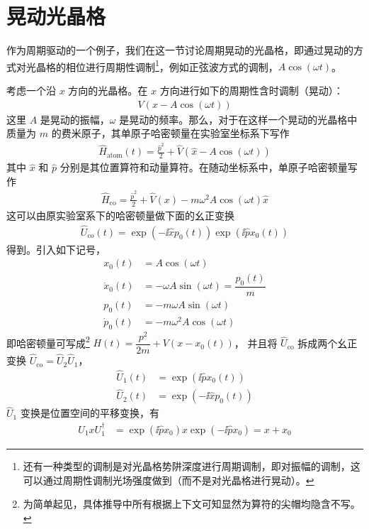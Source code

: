 \section{晃动光晶格}\label{sec:floq:sl}

作为周期驱动的一个例子，我们在这一节讨论周期晃动的光晶格，即通过晃动的方式对光晶格的相位进行周期性调制\footnote{还有一种类型的调制是对光晶格势阱深度进行周期调制，即对振幅的调制，这可以通过周期性调制光场强度做到（而不是对光晶格进行晃动）。}，例如正弦波方式的调制，$A\cos(\omega t)$。

考虑一个沿 $x$ 方向的光晶格。在 $x$ 方向进行如下的周期性含时调制（晃动）：
\begin{align}
V(x - A\cos(\omega t))
\end{align}
这里 $A$ 是晃动的振幅，$\omega$ 是晃动的频率。那么，对于在这样一个晃动的光晶格中质量为 $m$ 的费米原子，其单原子哈密顿量在实验室坐标系下写作
\begin{align}
\hat{H}_{\text{atom}}(t) = \frac{\hat{p}^2}{2} + \hat{V}(\hat{x} - A\cos(\omega t))
\end{align}
其中 $\hat{x}$ 和 $\hat{p}$ 分别是其位置算符和动量算符。在随动坐标系中，单原子哈密顿量写作
\begin{align}
\hat{H}_{\text{co}} = \frac{\hat{p}^2}{2} + \hat{V}(x) - m\omega^2A\cos(\omega t)\hat{x}
\end{align}
这可以由原实验室系下的哈密顿量做下面的幺正变换
\begin{align}
\hat{U}_{\text{co}}(t) = \exp(-\ii\hat{x}p_0(t))\exp(\ii\hat{p}x_0(t))
\end{align}
得到。引入如下记号，
\begin{align}
    x_0(t) &= A\cos(\omega t) \\
    \dot{x}_0(t) &=-\omega A\sin(\omega t)=\dfrac{p_0(t)}{m}\\
    p_0(t) &=-m\omega A\sin(\omega t)\\
    \dot{p}_0(t) &= -m\omega^2A\cos(\omega t)
\end{align}
即哈密顿量可写成\footnote{为简单起见，具体推导中所有根据上下文可知显然为算符的尖帽均隐含不写。}
$H(t)=\dfrac{p^2}{2m}+V(x-x_0(t))$，
并且将 $\hat{U}_{\text{co}}$ 拆成两个幺正变换 $\hat{U}_{\text{co}} = \hat{U}_2\hat{U}_1$，
\begin{align}
    \hat{U}_1(t) &=\exp(\ii\hat{p}x_0(t)) \\ 
    \hat{U}_2(t) &=\exp(-\ii\hat{x}p_0(t))
\end{align}
$\hat{U}_1$ 变换是位置空间的平移变换，有
\begin{align}
    U_1xU_1^{\dagger} &= \exp(\ii \hat{p}x_0)x\exp(-\ii\hat{p}x_0)=x+x_0
\end{align}
